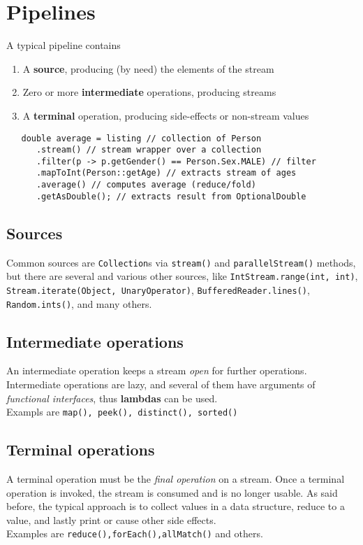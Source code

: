 \section{Pipelines}

{A typical pipeline contains\ns
\begin{enumerate}
   \item A \textbf{source}, producing (by need) the elements of the stream
   \item Zero or more \textbf{intermediate} operations, producing streams
   \item A \textbf{terminal} operation, producing side-effects or non-stream values
\end{enumerate}}

\begin{lstlisting}
   double average = listing // collection of Person
      .stream() // stream wrapper over a collection
      .filter(p -> p.getGender() == Person.Sex.MALE) // filter
      .mapToInt(Person::getAge) // extracts stream of ages
      .average() // computes average (reduce/fold)
      .getAsDouble(); // extracts result from OptionalDouble
\end{lstlisting}

\subsection{Sources}
Common sources are \lstinline|Collection|s via \lstinline|stream()| and \lstinline|parallelStream()| methods,
but there are several and various other sources,
like \lstinline|IntStream.range(int, int)|, \lstinline|Stream.iterate(Object, UnaryOperator)|, \lstinline|BufferedReader.lines()|, \lstinline|Random.ints()|, and many others.

\subsection{Intermediate operations}
An intermediate operation keeps a stream \textit{open} for further operations.
Intermediate operations are lazy, and 
several of them have arguments of \textit{functional interfaces},
thus \textbf{lambdas} can be used.\\
Exampls are \lstinline|map(), peek(), distinct(), sorted()|

\subsection{Terminal operations}
A terminal operation must be the \textit{final operation} on a stream.
Once a terminal operation is invoked, the stream is consumed and is no longer usable.
As said before, the typical approach is to collect values in a data structure, reduce to a value, and lastly print or
cause other side effects.\\
Examples are \lstinline|reduce(),forEach(),allMatch()| and others.

